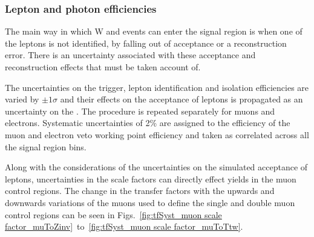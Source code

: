 \subsubsection*{Lepton and photon efficiencies}
\label{sec:tfSyst_lepton}

The main way in which W and \ttbar events can enter the signal region
is when one of the leptons is not identified, by falling out of
acceptance or a reconstruction error. There is an uncertainty
associated with these acceptance and reconstruction effects that must
be taken account of.

The uncertainties on the trigger, lepton identification and isolation
efficiencies are varied by $\pm1\sigma$ and their effects on the
acceptance of leptons is propagated as an uncertainty on the \TFs.
The procedure is repeated separately for muons and electrons.
Systematic uncertainties of 2\% are assigned to the efficiency of the
muon and electron veto working point efficiency and taken as
correlated across all the signal region bins. 

Along with the considerations of the uncertainties on the simulated
acceptance of leptons, uncertainties in the scale factors can directly
effect yields in the muon control regions. The change in the transfer
factors with the upwards and downwards variations of the muons used to
define the single and double muon control regions can be seen in
Figs.~\ref{fig:tfSyst_muon scale
factor_muToZinv}~to~\ref{fig:tfSyst_muon scale factor_muToTtw}.



